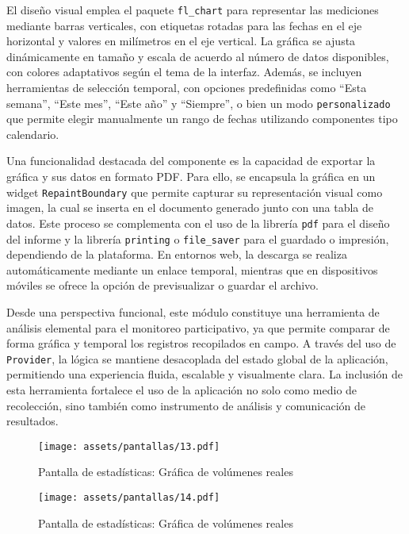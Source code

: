 El diseño visual emplea el paquete \texttt{fl\_chart} para representar las mediciones mediante barras verticales, con etiquetas rotadas para las fechas en el eje horizontal y valores en milímetros en el eje vertical. La gráfica se ajusta dinámicamente en tamaño y escala de acuerdo al número de datos disponibles, con colores adaptativos según el tema de la interfaz. Además, se incluyen herramientas de selección temporal, con opciones predefinidas como ``Esta semana'', ``Este mes'', ``Este año'' y ``Siempre'', o bien un modo \texttt{personalizado} que permite elegir manualmente un rango de fechas utilizando componentes tipo calendario.

Una funcionalidad destacada del componente es la capacidad de exportar la gráfica y sus datos en formato PDF. Para ello, se encapsula la gráfica en un widget \texttt{RepaintBoundary} que permite capturar su representación visual como imagen, la cual se inserta en el documento generado junto con una tabla de datos. Este proceso se complementa con el uso de la librería \texttt{pdf} para el diseño del informe y la librería \texttt{printing} o \texttt{file\_saver} para el guardado o impresión, dependiendo de la plataforma. En entornos web, la descarga se realiza automáticamente mediante un enlace temporal, mientras que en dispositivos móviles se ofrece la opción de previsualizar o guardar el archivo.

Desde una perspectiva funcional, este módulo constituye una herramienta de análisis elemental para el monitoreo participativo, ya que permite comparar de forma gráfica y temporal los registros recopilados en campo. A través del uso de \texttt{Provider}, la lógica se mantiene desacoplada del estado global de la aplicación, permitiendo una experiencia fluida, escalable y visualmente clara. La inclusión de esta herramienta fortalece el uso de la aplicación no solo como medio de recolección, sino también como instrumento de análisis y comunicación de resultados.


 


\begin{figure}[h!]
\centering
  \texttt{[image: assets/pantallas/13.pdf]}
  \caption{Pantalla de estadísticas: Gráfica de volúmenes reales }
  \label{pantallas13}
\end{figure}


\begin{figure}[h!]
\centering
  \texttt{[image: assets/pantallas/14.pdf]}
  \caption{Pantalla de estadísticas: Gráfica de volúmenes reales }
  \label{pantallas14}
\end{figure}

